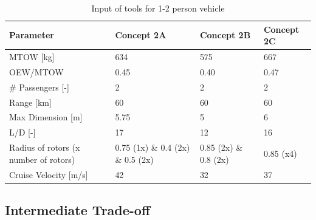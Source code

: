 \begin{table}[H]
\captionsetup{justification=centering}
\caption{Input of tools for 1-2 person vehicle}
\label{12input}
\begin{tabular}{@{}llll@{}}
\toprule
\textbf{Parameter}                       & \textbf{Concept 2A} & \textbf{Concept 2B} & \textbf{Concept 2C} \\ \midrule
MTOW {[}kg{]}                            &           634         &        575           &         667           \\
OEW/MTOW           &          0.45          &         0.40          &             0.47       \\
\# Passengers {[}-{]}                    &          2          &         2           &             2       \\
Range {[}km{]}                           &          60          &         60     &            60        \\
Max Dimension {[}m{]}                    &         5.75           &          5          &            6        \\
L/D {[}-{]}                              &           17         &        12            &           16         \\
Radius of rotors (x number of rotors) &   0.75 (1x) \& 0.4 (2x) \& 0.5 (2x)                &    0.85 (2x) \& 0.8 (2x)&            0.85 (x4)       \\
Cruise Velocity {[}m/s{]}                &          42          &        32            &            37        \\ \bottomrule
\end{tabular}

\end{table}


\subsection{Intermediate Trade-off}
\label{InterTO-12}

